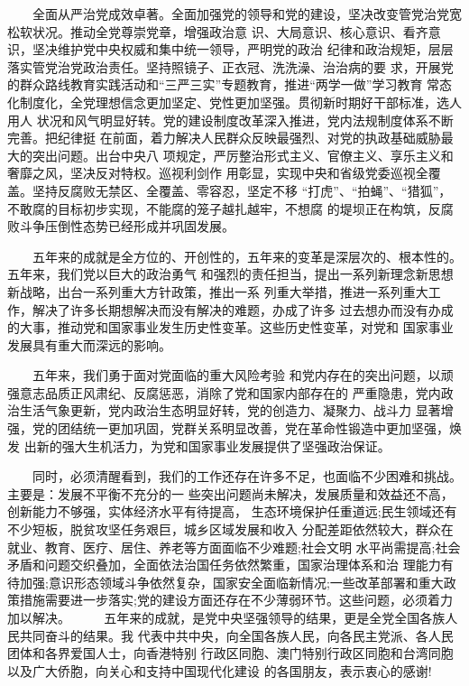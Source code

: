 \documentclass[11pt]{ctexart}
\begin{document}
{{{{　　全面从严治党成效卓著。全面加强党的领导和党的建设，坚决改变管党治党宽松软状况。推动全党尊崇党章，增强政治意
识、大局意识、核心意识、看齐意识，坚决维护党中央权威和集中统一领导，严明党的政治
纪律和政治规矩，层层落实管党治党政治责任。坚持照镜子、正衣冠、洗洗澡、治治病的要
求，开展党的群众路线教育实践活动和“三严三实”专题教育，推进“两学一做”学习教育
常态化制度化，全党理想信念更加坚定、党性更加坚强。贯彻新时期好干部标准，选人用人
状况和风气明显好转。党的建设制度改革深入推进，党内法规制度体系不断完善。把纪律挺
在前面，着力解决人民群众反映最强烈、对党的执政基础威胁最大的突出问题。出台中央八
项规定，严厉整治形式主义、官僚主义、享乐主义和奢靡之风，坚决反对特权。巡视利剑作
用彰显，实现中央和省级党委巡视全覆盖。坚持反腐败无禁区、全覆盖、零容忍，坚定不移
“打虎”、“拍蝇”、“猎狐”，不敢腐的目标初步实现，不能腐的笼子越扎越牢，不想腐
的堤坝正在构筑，反腐败斗争压倒性态势已经形成并巩固发展。

　　五年来的成就是全方位的、开创性的，五年来的变革是深层次的、根本性的。五年来，我们党以巨大的政治勇气
和强烈的责任担当，提出一系列新理念新思想新战略，出台一系列重大方针政策，推出一系
列重大举措，推进一系列重大工作，解决了许多长期想解决而没有解决的难题，办成了许多
过去想办而没有办成的大事，推动党和国家事业发生历史性变革。这些历史性变革，对党和
国家事业发展具有重大而深远的影响。

　　五年来，我们勇于面对党面临的重大风险考验
和党内存在的突出问题，以顽强意志品质正风肃纪、反腐惩恶，消除了党和国家内部存在的
严重隐患，党内政治生活气象更新，党内政治生态明显好转，党的创造力、凝聚力、战斗力
显著增强，党的团结统一更加巩固，党群关系明显改善，党在革命性锻造中更加坚强，焕发
出新的强大生机活力，为党和国家事业发展提供了坚强政治保证。

　　同时，必须清醒看到，我们的工作还存在许多不足，也面临不少困难和挑战。主要是：发展不平衡不充分的一
些突出问题尚未解决，发展质量和效益还不高，创新能力不够强，实体经济水平有待提高，
生态环境保护任重道远;民生领域还有不少短板，脱贫攻坚任务艰巨，城乡区域发展和收入
分配差距依然较大，群众在就业、教育、医疗、居住、养老等方面面临不少难题;社会文明
水平尚需提高;社会矛盾和问题交织叠加，全面依法治国任务依然繁重，国家治理体系和治
理能力有待加强;意识形态领域斗争依然复杂，国家安全面临新情况;一些改革部署和重大政
策措施需要进一步落实;党的建设方面还存在不少薄弱环节。这些问题，必须着力加以解决。
　
　五年来的成就，是党中央坚强领导的结果，更是全党全国各族人民共同奋斗的结果。我
代表中共中央，向全国各族人民，向各民主党派、各人民团体和各界爱国人士，向香港特别
行政区同胞、澳门特别行政区同胞和台湾同胞以及广大侨胞，向关心和支持中国现代化建设
的各国朋友，表示衷心的感谢!

}}}}
\end{document}

